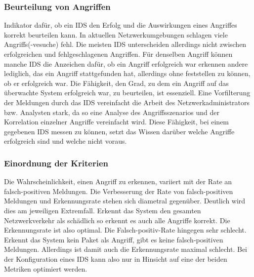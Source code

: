 \subsubsection{Beurteilung von Angriffen}
Indikator dafür, ob ein IDS den Erfolg und die Auswirkungen eines Angriffes korrekt beurteilen kann. In aktuellen Netzwerkumgebungen schlagen viele Angriffs(-vesuche) fehl. Die meisten IDS unterscheiden allerdings nicht zwischen erfolgreichen und fehlgeschlagenen Angriffen. Für denselben Angriff können manche IDS die Anzeichen dafür, ob ein Angriff erfolgreich war erkennen andere lediglich, das ein Angriff stattgefunden hat, allerdings ohne feststellen zu können, ob er erfolgreich war. Die Fähigkeit, den Grad, zu dem ein Angriff auf das überwachte System erfolgreich war, zu beurteilen, ist essenziell. Eine Vorfilterung der Meldungen durch das IDS vereinfacht die Arbeit des Netzwerkadministrators bzw. Analysten stark, da so eine Analyse des Angriffsszenarios und der Korrelation einzelner Angriffe vereinfacht wird. Diese Fähigkeit, bei einem gegebenen IDS messen zu können, setzt das Wissen darüber welche Angriffe erfolgreich sind und welche nicht voraus.


\subsubsection{Einordnung der Kriterien}
Die Wahrscheinlichkeit, einen Angriff zu erkennen, variiert mit der Rate an falsch-positiven Meldungen. Die Verbesserung der Rate von falsch-positiven Meldungen und Erkennungsrate stehen sich diametral gegenüber. Deutlich wird dies am jeweiligen Extremfall. Erkennt das System den gesamten Netzwerkverkehr als schädlich so erkennt es auch alle Angriffe korrekt. Die Erkennungsrate ist also optimal. Die Falsch-positiv-Rate hingegen sehr schlecht. Erkennt das System kein Paket als Angriff, gibt es keine falsch-positiven Meldungen. Allerdings ist damit auch die Erkennungsrate maximal schlecht. Bei der Konfiguration eines IDS kann also nur in Hinsicht auf eine der beiden Metriken optimiert werden.

